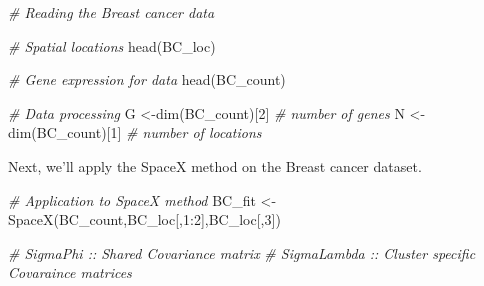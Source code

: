 \documentclass[
]{book}
\newenvironment{Shaded}{\begin{snugshade}}{\end{snugshade}}
\newcommand{\CommentTok}[1]{\textcolor[rgb]{0.56,0.35,0.01}{\textit{#1}}}
\newcommand{\DecValTok}[1]{\textcolor[rgb]{0.00,0.00,0.81}{#1}}
\newcommand{\FunctionTok}[1]{\textcolor[rgb]{0.00,0.00,0.00}{#1}}
\newcommand{\NormalTok}[1]{#1}
\newcommand{\OtherTok}[1]{\textcolor[rgb]{0.56,0.35,0.01}{#1}}
\newcommand{\SpecialCharTok}[1]{\textcolor[rgb]{0.00,0.00,0.00}{#1}}
\begin{document}
\begin{Shaded}
\begin{Highlighting}[]
\CommentTok{\# Reading the Breast cancer data}

\CommentTok{\# Spatial locations}
\FunctionTok{head}\NormalTok{(BC\_loc)}

\CommentTok{\# Gene expression for data}
\FunctionTok{head}\NormalTok{(BC\_count) }

\CommentTok{\# Data processing}
\NormalTok{G }\OtherTok{\textless{}{-}}\FunctionTok{dim}\NormalTok{(BC\_count)[}\DecValTok{2}\NormalTok{] }\CommentTok{\# number of genes}
\NormalTok{N }\OtherTok{\textless{}{-}}\FunctionTok{dim}\NormalTok{(BC\_count)[}\DecValTok{1}\NormalTok{] }\CommentTok{\# number of locations}
\end{Highlighting}
\end{Shaded}

Next, we'll apply the SpaceX method on the Breast cancer dataset.

\begin{Shaded}
\begin{Highlighting}[]
\CommentTok{\# Application to SpaceX method}
\NormalTok{BC\_fit }\OtherTok{\textless{}{-}} \FunctionTok{SpaceX}\NormalTok{(BC\_count,BC\_loc[,}\DecValTok{1}\SpecialCharTok{:}\DecValTok{2}\NormalTok{],BC\_loc[,}\DecValTok{3}\NormalTok{])}

\CommentTok{\# SigmaPhi :: Shared Covariance matrix}
\CommentTok{\# SigmaLambda :: Cluster specific Covaraince matrices}
\end{Highlighting}
\end{Shaded}


  
\end{document}
